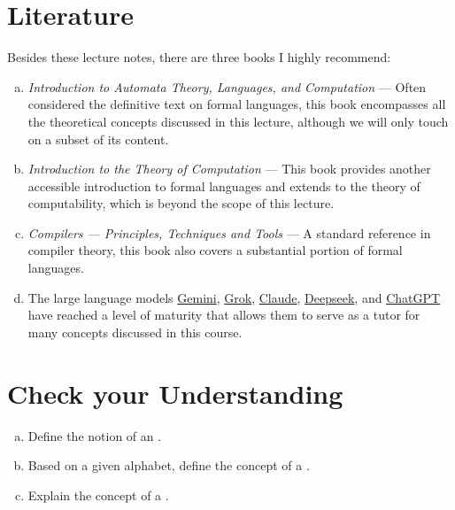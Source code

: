 \section{Literature}
Besides these lecture notes, there are three books I highly recommend:
\begin{enumerate}[(a)]
\item \emph{Introduction to Automata Theory, Languages, and Computation} \cite{hopcroft:06}
      --- Often considered   the definitive text on formal languages, this book encompasses all the theoretical
      concepts discussed in this lecture, although we will only touch on a subset of its content. 
\item \emph{Introduction to the Theory of Computation} \cite{sipser:2012}
      --- This book provides another accessible introduction to formal languages and extends to the theory of
      computability, which is beyond the scope of this lecture. 
\item \emph{Compilers --- Principles, Techniques and Tools} \cite{aho:2006}
      --- A standard reference in compiler theory, this book also covers a substantial portion of formal languages.
\item The large language models \href{https://gemini.google.com/}{Gemini},
      \href{https://grok.com/}{Grok}, \href{https://claude.ai/}{Claude}, \href{https://www.deepseek.com/}{Deepseek},
      and \href{https://chatgpt.com/}{ChatGPT} have reached a level of maturity
      that allows them to serve as a tutor for many concepts discussed in this course.
\end{enumerate}

\section{Check your Understanding}
\begin{enumerate}[(a)]
\item Define the notion of an .
\item Based on a given alphabet, define the concept of a .
\item Explain the concept of a .
\end{enumerate}



